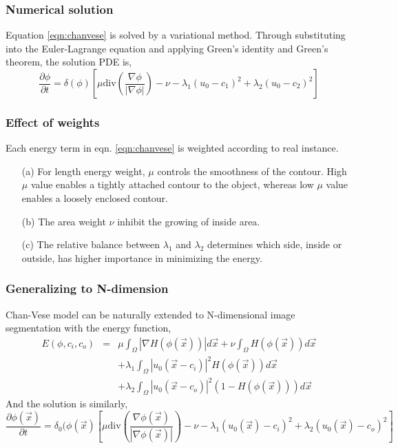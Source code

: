 \subsubsection{Numerical solution}
Equation \ref{eqn:chanvese} is solved by a variational method. Through substituting into the Euler-Lagrange equation and applying Green's identity and Green's theorem, the solution PDE is,
\begin{equation}
\frac{\partial \phi}{\partial t} = \delta(\phi)\left[\mu\mbox{div}\left(\frac{\nabla\phi}{|\nabla\phi|}\right)-\nu -\lambda_1(u_0-c_1)^2 + \lambda_2(u_0-c_2)^2\right]
\end{equation}

\subsubsection{Effect of weights}
Each energy term in eqn. \ref{eqn:chanvese} is weighted according to real instance. 
\begin{itemize}
\item[(a)] For length energy weight, $\mu$ controls the smoothness of the contour. High $\mu$ value enables a tightly attached contour to the object, whereas low $\mu$ value enables a loosely enclosed contour. 
\item[(b)] The area weight $\nu$ inhibit the growing of inside area. 
\item[(c)] The relative balance between $\lambda_1$ and $\lambda_2$ determines which side, inside or outside, has higher importance in minimizing the energy. 
\end{itemize}

\subsubsection{Generalizing to N-dimension}
Chan-Vese model can be naturally extended to N-dimensional image segmentation with the energy function,
\begin{eqnarray}
\nonumber
E(\phi, c_i, c_o) & = & \mu\int_\Omega |\nabla H(\phi(\vec{x}))|d\vec{x} + \nu\int_\Omega H(\phi(\vec{x}))d\vec{x}\\
                 &    & + \lambda_1\int_\Omega |u_0(\vec{x} - c_i)|^2H(\phi(\vec{x}))d\vec{x} \\
\nonumber
				 &    & + \lambda_2\int_\Omega |u_0(\vec{x} - c_o)|^2(1 - H(\phi(\vec{x})))d\vec{x}
\end{eqnarray}
And the solution is similarly,
\begin{equation}
\frac{\partial \phi(\vec{x})}{\partial t} = \delta_0(\phi(\vec{x})\left[\mu\mbox{div}\left(\frac{\nabla\phi(\vec{x})}{|\nabla\phi(\vec{x})|}\right)-\nu -\lambda_1(u_0(\vec{x})-c_i)^2 + \lambda_2(u_0(\vec{x})-c_o)^2\right] 
\end{equation}

